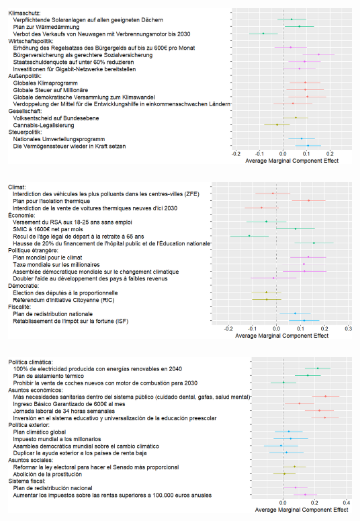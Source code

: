 \begin{figure}[h] 
  \caption[Preferences for various policies in political platforms (original)]{Effects of the presence of a policy (rather than none from this domain) in a random platform on the likelihood that it is preferred to another random platform. (See English translations in Figure \ref{fig:ca_r}; Question \ref{q:conjoint_r}%
  )}\label{fig:ca_r_en}
    \begin{subfigure}{.97\textwidth}
      \includegraphics[width=.97\textwidth]{../figures/DE/ca_r.png}
    \end{subfigure}
    \begin{subfigure}{.98\textwidth}
      \includegraphics[width=.98\textwidth]{../figures/FR/ca_r.png}
    \end{subfigure}
    \begin{subfigure}{.98\textwidth}
      \includegraphics[width=.98\textwidth]{../figures/ES/ca_r.png}
    \end{subfigure}
\end{figure}

